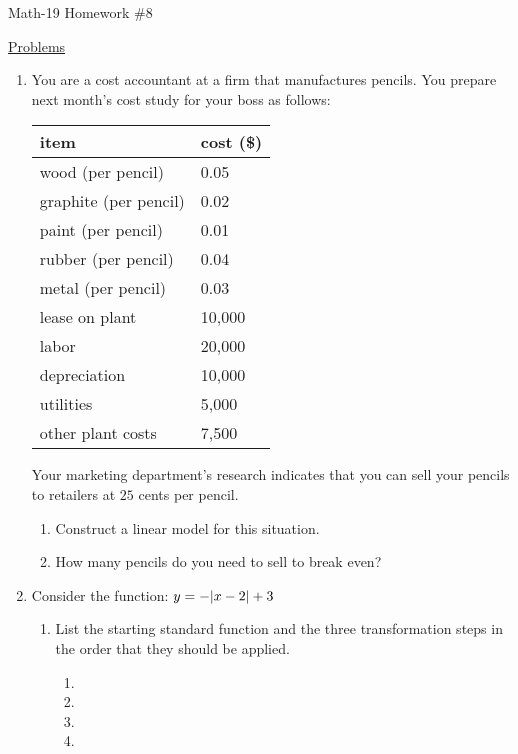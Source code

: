 \documentclass[letterpaper,12pt,fleqn]{article}
\begin{document}
\begin{center}
\Large Math-19 Homework \#8
\end{center}

\underline{Problems}

\begin{enumerate}
\item You are a cost accountant at a firm that manufactures pencils. You
  prepare next month's cost study for your boss as follows:

  \begin{tabular}{|l|l|}
    \hline
    item & cost (\$) \\
    \hline
    wood (per pencil) & 0.05 \\
    graphite (per pencil) & 0.02 \\
    paint (per pencil) & 0.01 \\
    rubber (per pencil) & 0.04 \\
    metal (per pencil) & 0.03 \\
    lease on plant & 10,000 \\
    labor & 20,000 \\
    depreciation & 10,000 \\
    utilities & 5,000 \\
    other plant costs & 7,500 \\
    \hline
  \end{tabular}

  Your marketing department's research indicates that you can sell your pencils
  to retailers at $25$ cents per pencil.
  \begin{enumerate}
  \item Construct a linear model for this situation.
  \item How many pencils do you need to sell to break even?
  \end{enumerate}

\item Consider the function: $y=-\lvert x-2\rvert+3$
  \begin{enumerate}
  \item List the starting standard function and the three transformation
    steps in the order that they should be applied.
    \begin{enumerate}
    \item
    \item
    \item
    \item
    \end{enumerate}


\end{enumerate}
\end{enumerate}
\end{document}
